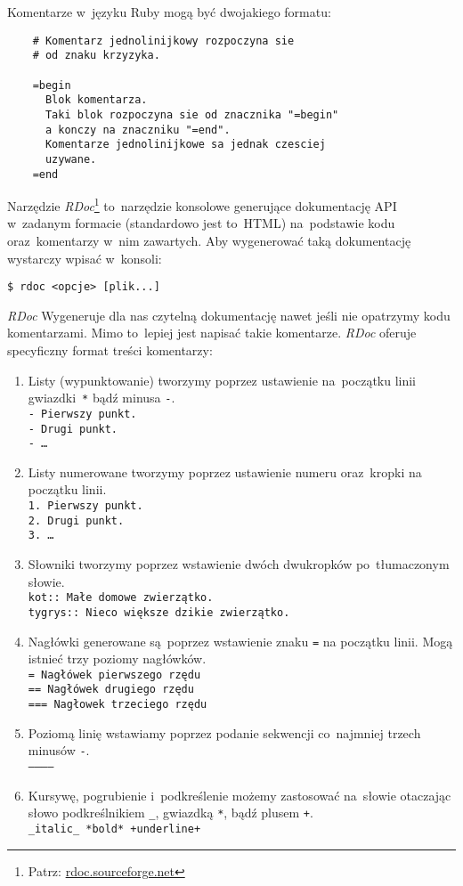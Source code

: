 Komentarze w~języku Ruby mogą być dwojakiego formatu:

  \begin{lstlisting}
    # Komentarz jednolinijkowy rozpoczyna sie
    # od znaku krzyzyka.

    =begin
      Blok komentarza.
      Taki blok rozpoczyna sie od znacznika "=begin"
      a konczy na znaczniku "=end".
      Komentarze jednolinijkowe sa jednak czesciej
      uzywane.
    =end
  \end{lstlisting}


Narzędzie \textit{RDoc}\footnote{Patrz: \url{rdoc.sourceforge.net}} to~narzędzie konsolowe generujące dokumentację API w~zadanym formacie (standardowo jest to~HTML) na~podstawie kodu oraz~komentarzy w~nim zawartych. Aby wygenerować taką dokumentację wystarczy wpisać w~konsoli:

\mbox{\texttt{\$ rdoc <opcje> [plik...] }}

\textit{RDoc} Wygeneruje dla nas czytelną dokumentację nawet jeśli nie opatrzymy kodu komentarzami. Mimo to~lepiej jest napisać takie komentarze. \textit{RDoc} oferuje specyficzny format treści komentarzy:

\begin{enumerate}
  \item Listy (wypunktowanie) tworzymy poprzez ustawienie na~początku linii gwiazdki~\texttt{*} bądź minusa \texttt{-}.\\
    \texttt{- Pierwszy punkt.\\- Drugi punkt.\\- \ldots}
  \item Listy numerowane tworzymy poprzez ustawienie numeru oraz~kropki na początku linii.\\
    \texttt{1. Pierwszy punkt.\\2. Drugi punkt.\\3. \ldots}
  \item Słowniki tworzymy poprzez wstawienie dwóch dwukropków po~tłumaczonym słowie.\\
    \texttt{kot:: Małe domowe zwierzątko.\\tygrys::    Nieco większe dzikie zwierzątko.}
  \item Nagłówki generowane są~poprzez wstawienie znaku \texttt{=} na początku linii. Mogą istnieć trzy poziomy nagłówków.\\
    \texttt{= Nagłówek pierwszego rzędu\\== Nagłówek drugiego rzędu\\=== Nagłowek trzeciego rzędu}
  \item Poziomą linię wstawiamy poprzez podanie sekwencji co~najmniej trzech minusów \texttt{-}.\\
    \texttt{-----------}
  \item Kursywę, pogrubienie i~podkreślenie możemy zastosować na~słowie otaczając słowo podkreślnikiem \texttt{\_}, gwiazdką \texttt{*}, bądź plusem \texttt{+}.\\
    \texttt{\_italic\_  *bold*  +underline+}
\end{enumerate}

